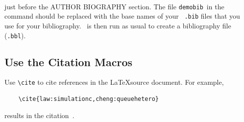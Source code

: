 \documentclass{article}
\begin{document}
\begin{verbatim}


\end{verbatim}

just before the AUTHOR BIOGRAPHY section.  The file \texttt{demobib}\ in the \verb++ command should be replaced with the base names of your \BibTeX\ \texttt{.bib} files that you use for your bibliography.  \BibTeX\ is then run as usual to create a bibliography file (\texttt{.bbl}).


\subsection{Use the Citation Macros}

Use \verb+\cite+ to cite references in the \LaTeX source document. For example,

\begin{verbatim}
    \cite{law:simulationc,cheng:queuehetero}
\end{verbatim} %
    
results in the citation~\cite{law:simulationc,cheng:queuehetero}.


    
    
    
    
    
    
\end{document}
